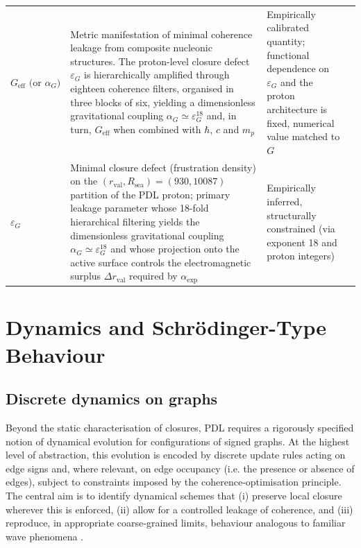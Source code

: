 \documentclass{article}
\begin{document}
\begin{longtable}{@{}p{1.7cm}p{6.6cm}L{4.5cm}p{2.5cm}@{}}
  $G_{\text{eff}} \text{ (or } \alpha_G\text{)}$ & 
  Metric manifestation of minimal coherence leakage from composite nucleonic structures. The proton-level closure defect $\varepsilon_G$ is hierarchically amplified through eighteen coherence filters, organised in three blocks of six, yielding a dimensionless gravitational coupling $\alpha_G \simeq \varepsilon_G^{18}$ and, in turn, $G_{\text{eff}}$ when combined with $\hbar$, $c$ and $m_p$ & Empirically calibrated quantity; functional dependence on $\varepsilon_G$ and the proton architecture is fixed, numerical value matched to $G$ 
  & \cite{Exponent_18_PDL_2026,Topological_Reformulation_PDL_2026,Universal_Coherence_Leakage_2026} \\


  $\varepsilon_G$ & 
  Minimal closure defect (frustration density) on the $(r_{\text{val}},R_{\text{sea}})=(930,10087)$ partition of the PDL proton; primary leakage parameter whose 18-fold hierarchical filtering yields the dimensionless gravitational coupling $\alpha_G \simeq \varepsilon_G^{18}$ and whose projection onto the active surface controls the electromagnetic surplus $\Delta r_{\text{val}}$ required by $\alpha_{\text{exp}}$ & Empirically inferred, structurally constrained (via exponent 18 and proton integers) & 
  \cite{Exponent_18_PDL_2026,Topological_Reformulation_PDL_2026,Universal_Coherence_Leakage_2026} \\

\end{longtable}

\section{Dynamics and Schr\"odinger-Type Behaviour}
\label{sec:dynamics}

\subsection{Discrete dynamics on graphs}
\label{subsec:discrete_dynamics}

Beyond the static characterisation of closures, PDL requires a rigorously specified notion of dynamical evolution for configurations of signed graphs. At the highest level of abstraction, this evolution is encoded by discrete update rules acting on edge signs and, where relevant, on edge occupancy (i.e. the presence or absence of edges), subject to constraints imposed by the coherence‑optimisation principle. The central aim is to identify dynamical schemes that (i) preserve local closure wherever this is enforced, (ii) allow for a controlled leakage of coherence, and (iii) reproduce, in appropriate coarse‑grained limits, behaviour analogous to familiar wave phenomena \citep{PDL_Main_2026,PDL_position}.
\end{document}
